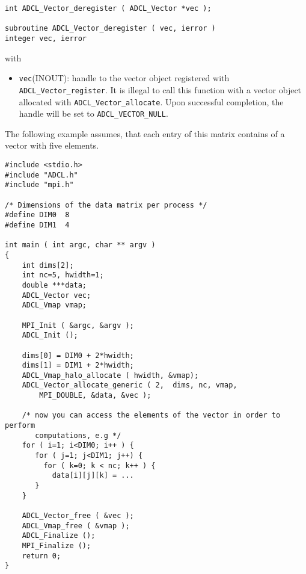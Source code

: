 \begin{verbatim}
int ADCL_Vector_deregister ( ADCL_Vector *vec );

subroutine ADCL_Vector_deregister ( vec, ierror )
integer vec, ierror
\end{verbatim}
with
\begin{itemize}
\item {\tt vec}(INOUT): handle to the vector object registered with {\tt
    ADCL\_Vector\-\_register}. It is illegal to call this function with a
  vector object allocated with {\tt ADCL\_Vector\_allocate}. Upon successful
  completion, the handle will be set to {\tt ADCL\_VECTOR\_NULL}.
\end{itemize}


The following example assumes, that each entry of this matrix contains of a
vector with five elements. 

\begin{verbatim}
#include <stdio.h>
#include "ADCL.h"
#include "mpi.h"

/* Dimensions of the data matrix per process */
#define DIM0  8
#define DIM1  4

int main ( int argc, char ** argv ) 
{
    int dims[2];
    int nc=5, hwidth=1;
    double ***data;
    ADCL_Vector vec;
    ADCL_Vmap vmap;    

    MPI_Init ( &argc, &argv );
    ADCL_Init ();
    
    dims[0] = DIM0 + 2*hwidth;
    dims[1] = DIM1 + 2*hwidth;
    ADCL_Vmap_halo_allocate ( hwidth, &vmap);
    ADCL_Vector_allocate_generic ( 2,  dims, nc, vmap,
        MPI_DOUBLE, &data, &vec );
    
    /* now you can access the elements of the vector in order to perform 
       computations, e.g */
    for ( i=1; i<DIM0; i++ ) {
       for ( j=1; j<DIM1; j++) {
         for ( k=0; k < nc; k++ ) {
           data[i][j][k] = ...
       }
    }
    
    ADCL_Vector_free ( &vec );        
    ADCL_Vmap_free ( &vmap );
    ADCL_Finalize ();
    MPI_Finalize ();
    return 0;
}
\end{verbatim}


